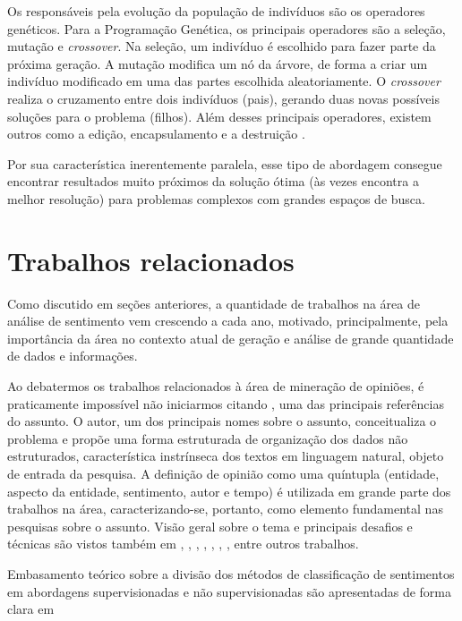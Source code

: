 \documentclass[12pt]{article}
\begin{document}
Os responsáveis pela evolução da população de indivíduos são os operadores genéticos. Para a Programação Genética, os principais operadores são a seleção, mutação e \emph{crossover}. Na seleção, um indivíduo é escolhido para fazer parte da próxima geração. A mutação modifica um nó da árvore, de forma a criar um indivíduo modificado em uma das partes escolhida aleatoriamente. O \emph{crossover} realiza o cruzamento entre dois indivíduos (pais), gerando duas novas possíveis soluções para o problema (filhos). Além desses principais operadores, existem outros como a edição, encapsulamento e a destruição \cite{patelli2011genetic}.

Por sua característica inerentemente paralela, esse tipo de abordagem consegue encontrar resultados muito próximos da solução ótima (às vezes encontra a melhor resolução) para problemas complexos com grandes espaços de busca.

\section{Trabalhos relacionados}

\label{sec:bibl}

Como discutido em seções anteriores, a quantidade de trabalhos na área de análise de sentimento vem crescendo a cada ano, motivado, principalmente, pela importância da área no contexto atual de geração e análise de grande quantidade de dados e informações.

Ao debatermos os trabalhos relacionados à área de mineração de opiniões, é praticamente impossível não iniciarmos citando \cite{liu2010multifaceted}, uma das principais referências do assunto. O autor, um dos principais nomes sobre o assunto, conceitualiza o problema e propõe uma forma estruturada de organização dos dados não estruturados, característica instrínseca dos textos em linguagem natural, objeto de entrada da pesquisa. A definição de opinião como uma quíntupla (entidade, aspecto da entidade, sentimento, autor e tempo) é utilizada em grande parte dos trabalhos na área, caracterizando-se, portanto, como elemento fundamental nas pesquisas sobre o assunto. Visão geral sobre o tema e principais desafios e técnicas são vistos também em \cite{mohammad2016challenges}, \cite{ghaleb2016survey}, \cite{kdir16}, \cite{taboada2011lexicon}, \cite{bandhakavi2016lexicon}, \cite{Alessia}, \cite{kaji}, entre outros trabalhos.

Embasamento teórico sobre a divisão dos métodos de classificação de sentimentos em abordagens supervisionadas e não supervisionadas são apresentadas de forma clara em \cite{araujo2013metodos}
\end{document}

